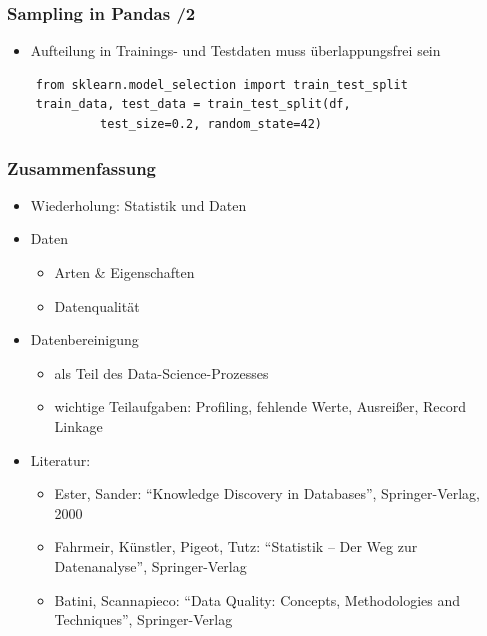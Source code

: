     
    \begin{frame}[fragile]
    \frametitle{Sampling in Pandas /2}
    
    \begin{itemize}
    \item Aufteilung in Trainings- und Testdaten muss überlappungsfrei sein
    \end{itemize}
    
    \begin{verbatim}
    from sklearn.model_selection import train_test_split
    train_data, test_data = train_test_split(df, 
             test_size=0.2, random_state=42)
    \end{verbatim}

    \end{frame}
    
    \begin{frame}
    \frametitle{Zusammenfassung}
    
    \begin{itemize}
    \item Wiederholung: Statistik und Daten
    \item Daten
    \begin{itemize}
    \item Arten \& Eigenschaften
    \item Datenqualität
    \end{itemize}
    \item Datenbereinigung
    \begin{itemize}
    \item als Teil des Data-Science-Prozesses
    \item wichtige Teilaufgaben: Profiling, fehlende Werte, Ausreißer,
      Record Linkage
    \end{itemize}
    \item Literatur: 
    \begin{itemize}
    \item Ester, Sander: "`Knowledge Discovery in Databases"',
      Springer-Verlag, 2000
    \item Fahrmeir, Künstler, Pigeot, Tutz: "`Statistik -- Der Weg zur
      Datenanalyse"', Springer-Verlag  
    \item Batini, Scannapieco: "`Data Quality: Concepts, Methodologies and
      Techniques"', Springer-Verlag
    \end{itemize}
    \end{itemize}
    
    \end{frame}
    